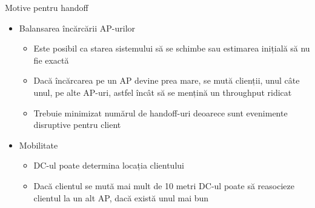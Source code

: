\begin{frame}{Motive pentru handoff}
\begin{itemize}
  \item Balansarea încărcării AP-urilor
  \begin{itemize}
    \item Este posibil ca starea sistemului să se schimbe sau estimarea inițială să nu fie exactă
    \item Dacă încărcarea pe un AP devine prea mare, se mută clienții, unul câte unul, pe alte AP-uri, astfel încât să se mențină un throughput ridicat
    \item Trebuie minimizat numărul de handoff-uri deoarece sunt evenimente disruptive pentru client
  \end{itemize}
  \item Mobilitate
  \begin{itemize}
    \item DC-ul poate determina locația clientului
    \item Dacă clientul se mută mai mult de 10 metri DC-ul poate să reasocieze clientul la un alt AP, dacă există unul mai bun
  \end{itemize}
\end{itemize}
\end{frame}

